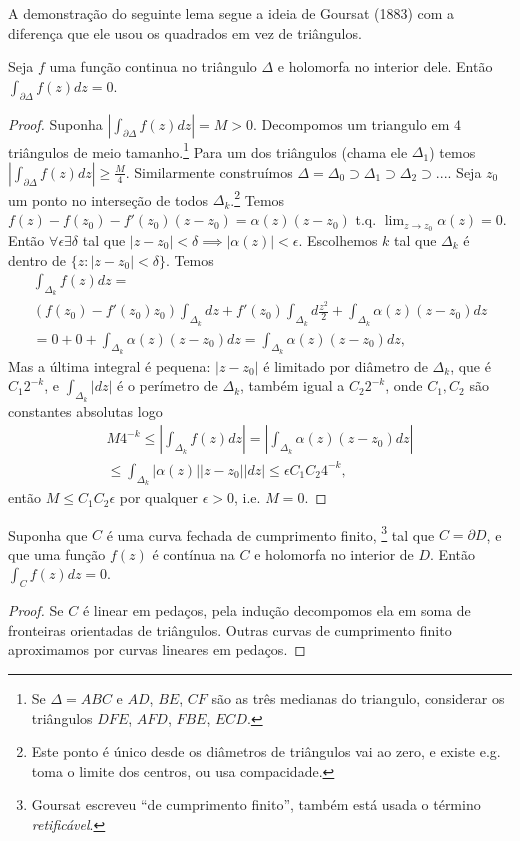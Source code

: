 A demonstração do seguinte lema segue a ideia de Goursat (1883) com a diferença que ele usou
os quadrados em vez de triângulos.
\begin{lema}[Goursat, 1883]
\label{l:goursat}
Seja $f$ uma função continua no triângulo $\Delta$ e holomorfa no interior dele.
Então $\int_{\partial\Delta} f(z) dz = 0$.
\end{lema}
\begin{proof}
Suponha $|\int_{\partial\Delta} f(z) dz| = M > 0$.
Decompomos um triangulo em $4$ triângulos de meio tamanho.\footnote{
Se $\Delta = ABC$ e $AD$, $BE$, $CF$ são as três medianas do triangulo,
considerar os triângulos $DFE$, $AFD$, $FBE$, $ECD$.}
Para um dos triângulos (chama ele $\Delta_1$) temos
$|\int_{\partial\Delta} f(z) dz| \geq \frac{M}{4}$.
Similarmente construímos $\Delta = \Delta_0 \supset \Delta_1 \supset \Delta_2 \supset ...$.
Seja $z_0$ um ponto no interseção de todos $\Delta_k$.\footnote{
Este ponto é único desde os diâmetros de triângulos vai ao zero,
e existe e.g. toma o limite dos centros, ou usa compacidade.}
Temos $f(z) - f(z_0) - f'(z_0) (z-z_0) = \alpha(z) (z-z_0)$ t.q.
$\lim_{z\to z_0} \alpha(z) = 0$. Então $\forall \epsilon \exists \delta$ tal que
$|z-z_0|<\delta \implies |\alpha(z)|<\epsilon$. Escolhemos $k$ tal que
$\Delta_k$ é dentro de $\{z: |z-z_0|<\delta\}$.
Temos
\begin{multline}
\int_{\Delta_k} f(z) dz = \\
(f(z_0)-f'(z_0)z_0) \int_{\Delta_k} dz + f'(z_0) \int_{\Delta_k} d\frac{z^2}{2}
+ \int_{\Delta_k} \alpha(z) (z-z_0) dz \\
= 0 + 0 + \int_{\Delta_k} \alpha(z) (z-z_0) dz = \int_{\Delta_k} \alpha(z) (z-z_0) dz,
\end{multline}
Mas a última integral é pequena: $|z-z_0|$ é limitado por diâmetro de $\Delta_k$,
que é $C_1 2^{-k}$, e $\int_{\Delta_k} |dz|$ é o perímetro de $\Delta_k$, também igual a $C_2 2^{-k}$,
onde $C_1,C_2$ são constantes absolutas
logo
\begin{multline*}
M 4^{-k} \leq |\int_{\Delta_k} f(z) dz| = |\int_{\Delta_k} \alpha(z) (z-z_0) dz| \\
\leq \int_{\Delta_k} |\alpha(z)| |z-z_0| |dz| \leq \epsilon C_1 C_2 4^{-k},
\end{multline*}
então $M \leq C_1 C_2 \epsilon$ por qualquer $\epsilon>0$, i.e. $M=0$.
\end{proof}

\begin{teorema}
\label{t:cauchy}
Suponha que $C$ é uma curva fechada de cumprimento finito,
\footnote{Goursat escreveu ``de cumprimento finito'', também está usada
o término \emph{retificável}.}
tal que $C = \partial D$,
e que uma função $f(z)$ é contínua na $C$ e holomorfa no interior de $D$. Então
$\int_C f(z) dz = 0$.
\end{teorema}
\begin{proof}
Se $C$ é linear em pedaços, pela indução decompomos ela em soma de fronteiras orientadas de triângulos.
Outras curvas de cumprimento finito aproximamos por curvas lineares em pedaços.
\end{proof}

